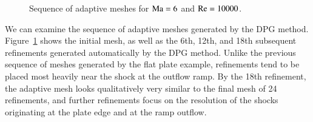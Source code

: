 \begin{figure}
\centering
{}
\caption{Sequence of adaptive meshes for ${\rm Ma} = 6$ and $\Reyn = 10000$.}
\label{fig:holdenMa6Meshes}
\end{figure}

We can examine the sequence of adaptive meshes generated by the DPG method.  Figure~\ref{fig:holdenMa6Meshes} shows the initial mesh, as well as the 6th, 12th, and 18th subsequent refinements generated automatically by the DPG method.  Unlike the previous sequence of meshes generated by the flat plate example, refinements tend to be placed most heavily near the shock at the outflow ramp.  By the 18th refinement, the adaptive mesh looks qualitatively very similar to the final mesh of 24 refinements, and further refinements focus on the resolution of the shocks originating at the plate edge and at the ramp outflow.  

